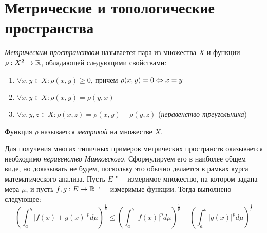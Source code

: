 \section{Метрические и топологические пространства}

\begin{definition}
	\textit{Метрическим пространством} называется пара из множества $X$ и функции $\rho : X^2 \to \mathbb{R}$, обладающей следующими свойствами:
	\begin{enumerate}
		\item $\forall x, y \in X: \rho(x, y) \ge 0$, причем $\rho(x, y) = 0 \Leftrightarrow x = y$
		\item $\forall x, y \in X: \rho(x, y) = \rho(y, x)$
		\item $\forall x, y, z \in X: \rho(x, z) = \rho(x, y) + \rho(y, z)$ (\textit{неравенство треугольника})
	\end{enumerate}

	Функция $\rho$ называется \textit{метрикой} на множестве $X$.
\end{definition}

\begin{note}
	Для получения многих типичных примеров метрических пространств оказывается необходимо \textit{неравенство Минковского}. Сформулируем его в наиболее общем виде, но доказывать не будем, поскольку это обычно делается в рамках курса математического анализа. Пусть $E$ "--- измеримое множество, на котором задана мера $\mu$, и пусть $f, g: E \to \mathbb{R}$ "--- измеримые функции. Тогда выполнено следующее:
	\[\left(\int_a^b|f(x) + g(x)|^pd\mu\right)^{\frac 1p} \le \left(\int_a^b|f(x)|^pd\mu\right)^{\frac 1p} + \left(\int_a^b|g(x)|^pd\mu\right)^{\frac 1p}\]
\end{note}

